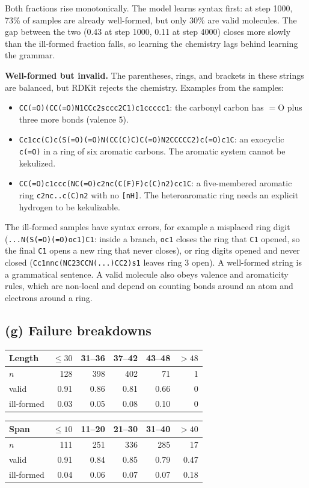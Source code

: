 \documentclass[11pt]{article}
\begin{document}
Both fractions rise monotonically. The model learns syntax first: at step 1000,
73\% of samples are already well-formed, but only 30\% are valid molecules. The gap between
the two (0.43 at step 1000, 0.11 at step 4000) closes more slowly than the ill-formed fraction
falls, so learning the chemistry lags behind learning the grammar.

\textbf{Well-formed but invalid.} The parentheses, rings, and brackets in these strings are
balanced, but RDKit rejects the chemistry. Examples from the samples:
\begin{itemize}\itemsep0pt
\item \texttt{CC(=O)(CC(=O)N1CCc2sccc2C1)c1ccccc1}: the carbonyl carbon has
  $=$O plus three more bonds (valence 5).
\item \texttt{Cc1cc(C)c(S(=O)(=O)N(CC(C)C)C(=O)N2CCCCC2)c(=O)c1C}: an exocyclic
  \texttt{c(=O)} in a ring of six aromatic carbons. The aromatic system cannot be kekulized.
\item \texttt{CC(=O)c1ccc(NC(=O)c2nc(C(F)F)c(C)n2)cc1C}: a five-membered aromatic
  ring \texttt{c2nc..c(C)n2} with no \texttt{[nH]}. The heteroaromatic ring needs an explicit
  hydrogen to be kekulizable.
\end{itemize}
The ill-formed samples have syntax errors, for example a misplaced ring digit
(\texttt{...N(S(=O)(=O)oc1)C1}: inside a branch, \texttt{oc1} closes the ring that \texttt{C1} opened,
so the final \texttt{C1} opens a new ring that never closes), or ring digits
opened and never closed (\texttt{Cc1nnc(NC23CCN(...)CC2)s1} leaves ring 3 open).
A well-formed string is a grammatical sentence. A valid molecule also obeys
valence and aromaticity rules, which are non-local and depend on counting bonds
around an atom and electrons around a ring.

\subsection*{(g) Failure breakdowns}

\begin{table}[H]\centering
\begin{tabular}{lrrrrr}\toprule
Length & $\le30$ & 31--36 & 37--42 & 43--48 & $>48$\\\midrule
$n$ & 128 & 398 & 402 & 71 & 1\\
valid & 0.91 & 0.86 & 0.81 & 0.66 & 0\\
ill-formed & 0.03 & 0.05 & 0.08 & 0.10 & 0\\\bottomrule
\end{tabular}
\quad
\begin{tabular}{lrrrrr}\toprule
Span & $\le10$ & 11--20 & 21--30 & 31--40 & $>40$\\\midrule
$n$ & 111 & 251 & 336 & 285 & 17\\
valid & 0.91 & 0.84 & 0.85 & 0.79 & 0.47\\
ill-formed & 0.04 & 0.06 & 0.07 & 0.07 & 0.18\\\bottomrule
\end{tabular}
\end{table}
\end{document}

